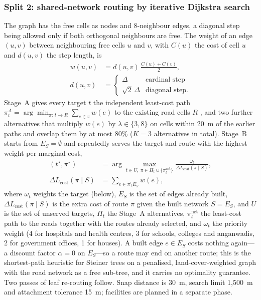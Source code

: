 \documentclass[10pt,a4paper,twocolumn]{article}
\newcommand{\Lcost}{L_{\mathrm{cost}}}
\begin{document}
\subsubsection{Split 2: shared-network routing by iterative Dijkstra search}\label{sec:routing}
The graph has the free cells as nodes and 8-neighbour edges, a diagonal step being allowed only if both orthogonal neighbours are free. The weight of an edge $(u,v)$ between neighbouring free cells $u$ and $v$, with $C(u)$ the cost of cell $u$ and $d(u,v)$ the step length, is
\begin{equation}
\begin{aligned}
w(u,v)&=d(u,v)\,\frac{C(u)+C(v)}{2},\\
d(u,v)&=\begin{cases}\Delta&\text{cardinal step}\\ \sqrt2\,\Delta&\text{diagonal step.}\end{cases}
\end{aligned}
\label{eq:edge}
\end{equation}
Stage~A gives every target $t$ the independent least-cost path $\pi_t^{A}=\arg\min_{\pi:\,t\to R}\sum_{e\in\pi}w(e)$ to the existing road cells $R$ \cite{dijkstra1959note,hart1968astar,collischonn2000lcp}, and two further alternatives that multiply $w(e)$ by $\lambda\in\{3,8\}$ on cells within 20~m of the earlier paths and overlap them by at most 80\% ($K=3$ alternatives in total). Stage~B starts from $E_S=\emptyset$ and repeatedly serves the target and route with the highest weight per marginal cost,
\begin{equation}
\begin{aligned}
(t^\star,\pi^\star)&=\arg\max_{t\in U,\ \pi\in\Pi_t\cup\{\pi_t^{\mathrm{net}}\}}\frac{\omega_t}{\Delta\Lcost(\pi\mid S)},\\
\Delta\Lcost(\pi\mid S)&=\sum_{e\in\pi\setminus E_S}w(e),
\end{aligned}
\label{eq:stageb}
\end{equation}
where $\omega_t$ weights the target (below), $E_S$ is the set of edges already built, $\Delta\Lcost(\pi\mid S)$ is the extra cost of route $\pi$ given the built network $S=E_S$, and $U$ is the set of unserved targets, $\Pi_t$ the Stage~A alternatives, $\pi_t^{\mathrm{net}}$ the least-cost path to the roads together with the routes already selected, and $\omega_t$ the priority weight (4 for hospitals and health centres, 3 for schools, colleges and anganwadis, 2 for government offices, 1 for houses). A built edge $e\in E_S$ costs nothing again---a discount factor $\alpha=0$ on $E_S$---so a route may end on another route; this is the shortest-path heuristic for Steiner trees \cite{kou1981steiner,mehlhorn1988steiner} on a penalised, land-cover-weighted graph with the road network as a free sub-tree, and it carries no optimality guarantee. Two passes of leaf re-routing follow. Snap distance is 30~m, search limit 1{,}500~m and attachment tolerance 15~m; facilities are planned in a separate phase.
\end{document}
